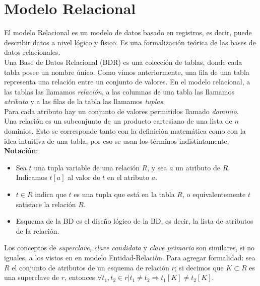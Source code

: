 \documentclass[a4paper]{article}
\begin{document}
\section{Modelo Relacional}
El modelo Relacional es un modelo de datos basado en registros, es decir, puede describir
datos a nivel l\'ogico y f\'isico. Es una formalizaci\'on te\'orica de las bases de datos
relacionales. \\
Una Base de Datos Relacional (BDR) es una colecci\'on de tablas, donde cada tabla posee un
nombre \'unico. Como vimos anteriormente, una fila de una tabla representa una relaci\'on
entre un conjunto de valores. En el modelo relacional, a las tablas las llamamos
\textit{relaci\'on}, a las columnas de una tabla las llamamos \textit{atributo} y a las
filas de la tabla las llamamos \textit{tuplas}. \\
Para cada atributo hay un conjunto de valores permitidos llamado \textit{dominio}. \\
Una relaci\'on es un subconjunto de un producto cartesiano de una lista de $n$ dominios.
Esto se corresponde tanto con la definici\'on matem\'atica como con la idea intuitiva de
una tabla, por eso se usan los t\'erminos indistintamente. \\
\textbf{Notaci\'on}:
\begin{itemize}
    \item Sea $t$ una tupla variable de una relaci\'on $R$, y sea $a$ un atributo
    de $R$. Indicamos $t[a]$ al valor de $t$ en el atributo $a$.
    \item $t \in R$ indica que $t$ es una tupla que est\'a en la tabla $R$, o
    equivalentemente $t$ satisface la relaci\'on $R$.
    \item Esquema de la BD es el diseño l\'ogico de la BD, es decir, la lista de
    atributos de la relaci\'on.
\end{itemize}
Los conceptos de \textit{superclave}, \textit{clave candidata} y \textit{clave primaria}
son similares, si no iguales, a los vistos en en modelo Entidad-Relaci\'on. Para agregar
formalidad: sea $R$ el conjunto de atributos de un esquema de relaci\'on $r$; si decimos
que $K \subset R$ es una superclave de $r$, entonces $\forall t_{1}, t_{2} \in r |
t_{1} \neq t_{2} \Rightarrow t_{1}[K] \neq t_{2}[K] $. \\
\end{document}

